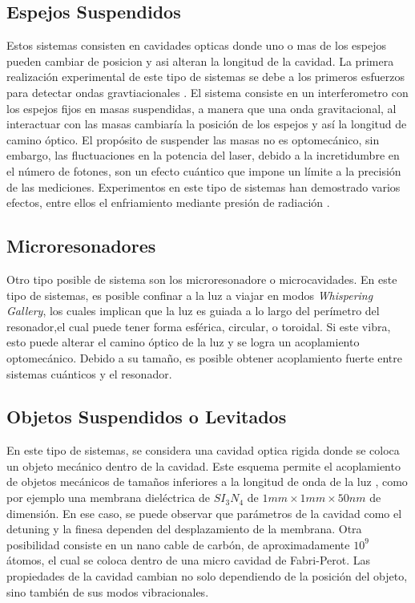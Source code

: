 \documentclass[a4paper,10pt]{report}
\begin{document}
\subsection{Espejos Suspendidos}

Estos sistemas consisten en cavidades opticas donde uno o mas de los espejos pueden cambiar de posicion y asi alteran la longitud de la cavidad. La primera realización experimental de este tipo de sistemas se debe a los primeros esfuerzos para detectar ondas gravtiacionales \cite{AbramoviciLIGO}. El sistema consiste en un interferometro con los espejos fijos en masas suspendidas, a manera que una onda gravitacional, al interactuar con las masas cambiaría la posición de los espejos y así la longitud de camino óptico. El propósito de suspender las masas no es optomecánico, sin embargo, las fluctuaciones en la potencia del laser, debido a la incretidumbre en el número de fotones, son un efecto cuántico que impone un límite a la precisión de las mediciones\cite{CavesIF}. Experimentos en este tipo de sistemas han demostrado varios efectos, entre ellos el enfriamiento mediante presión de radiación \cite{CorbittOC}.

\subsection{Microresonadores}

Otro tipo posible de sistema son los microresonadore o microcavidades. En este tipo de sistemas, es posible confinar a la luz a viajar en modos \textit{Whispering Gallery}, los cuales implican que la luz es guiada a lo largo del perímetro del resonador,el cual puede tener forma esférica, circular, o toroidal\cite{VahalaOM}. Si este vibra, esto puede alterar el camino óptico de la luz y se logra un acoplamiento optomecánico. Debido a su tamaño, es posible obtener acoplamiento fuerte entre sistemas cuánticos y el resonador\cite{VerhagenMOC}.

\subsection{Objetos Suspendidos o Levitados}

En este tipo de sistemas, se considera una cavidad optica rigida donde se coloca un objeto mecánico dentro de la cavidad. Este esquema permite el acoplamiento de objetos mecánicos de tamaños inferiores a la longitud de onda de la luz \cite{KippenberCO}, como por ejemplo una membrana dieléctrica de $SI_3N_4$ de  $1mm \times 1mm \times 50nm$
de dimensión\cite{SankeyMC}. En ese caso, se puede observar que parámetros de la cavidad como el detuning y la finesa dependen del desplazamiento de la membrana. Otra posibilidad consiste en un nano cable de carbón, de aproximadamente $10^9$ átomos, el cual se coloca dentro de una micro cavidad de Fabri-Perot. Las propiedades de la cavidad cambian no solo dependiendo de la posición del objeto, sino también de sus modos vibracionales\cite{FaveroCR}.  
\end{document}
